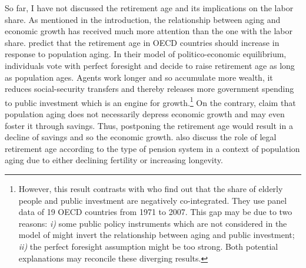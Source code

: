 \documentclass[
]{article}
\begin{document}
So far, I have not discussed the retirement age and its implications on the labor share.
As mentioned in the introduction, the relationship between aging and economic growth has received much more attention than the one with the labor share. \citet{Gonzalez-Eiras2012} predict that the retirement age in OECD countries should increase in response to population aging. In their model of politico-economic equilibrium, individuals vote with perfect foresight and decide to raise retirement age as long as population ages. Agents work longer and so accumulate more wealth, it reduces social-security transfers and thereby releases more government spending to public investment which is an engine for growth.\footnote{However, this result contrasts with \citet{Jager2016} who find out that the share of elderly people and public investment are negatively co-integrated. They use panel data of 19 OECD countries from 1971 to 2007. This gap may be due to two reasons: \emph{i)} some public policy instruments which are not considered in the model of \citet{Gonzalez-Eiras2012} might invert the relationship between aging and public investment; \emph{ii)} the perfect foresight assumption might be too strong. Both potential explanations may reconcile these diverging results.} On the contrary, \citet{Futagami2001} claim that population aging does not necessarily depress economic growth and may even foster it through savings. Thus, postponing the retirement age would result in a decline of savings and so the economic growth. \citet{Dedry2017} also discuss the role of legal retirement age according to the type of pension system in a context of population aging due to either declining fertility or increasing longevity.
\end{document}
